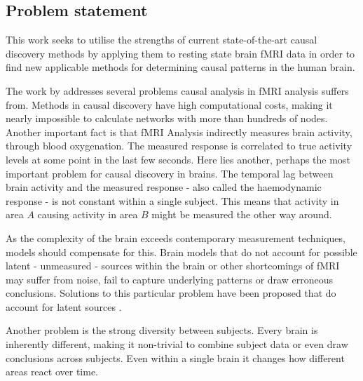 \documentclass[a4paper, 10pt, english, onecolumn]{article}
\begin{document}

\subsection{Problem statement}
This work seeks to utilise the strengths of current state-of-the-art causal discovery methods by applying them to resting state brain fMRI data in order to find new applicable methods for determining causal patterns in the human brain.

The work by \cite{ramsey2010} addresses several problems causal analysis in fMRI analysis suffers from.
Methods in causal discovery have high computational costs, making it nearly impossible to calculate networks with more than hundreds of nodes.
Another important fact is that fMRI Analysis indirectly measures brain activity, through blood oxygenation.
The measured response is correlated to true activity levels at some point in the last few seconds.
Here lies another, perhaps the most important problem for causal discovery in brains.
The temporal lag between brain activity and the measured response - also called the haemodynamic response -
is not constant within a single subject.
This means that activity in area $A$ causing activity in area $B$ might be measured the other way around.

As the complexity of the brain exceeds contemporary measurement techniques, models should compensate for this.
Brain models that do not account for possible latent - unmeasured - sources within the brain or other shortcomings of fMRI may suffer from noise, fail to capture underlying patterns or draw erroneous conclusions.
Solutions to this particular problem have been proposed that do account for latent sources \cite{ramsey2010, waldorp2011}.

Another problem is the strong diversity between subjects.
Every brain is inherently different, making it non-trivial to combine subject data or even draw conclusions across subjects.
Even within a single brain it changes how different areas react over time.
\end{document}
